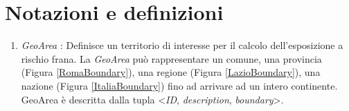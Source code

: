 
\chapter{Notazioni e definizioni} %

\label{ch:examples} %

\begin{enumerate}
	
	\item \textit{GeoArea} : Definisce un territorio di interesse per il calcolo dell'esposizione a rischio frana. La \textit{GeoArea} può rappresentare un comune, una provincia (Figura \ref{RomaBoundary}), una regione (Figura \ref{LazioBoundary}), una nazione (Figura \ref{ItaliaBoundary}) fino ad arrivare ad un intero continente. GeoArea è descritta dalla tupla <\textit{ID}, \textit{description}, \textit{boundary}>.
	

\end{enumerate}
